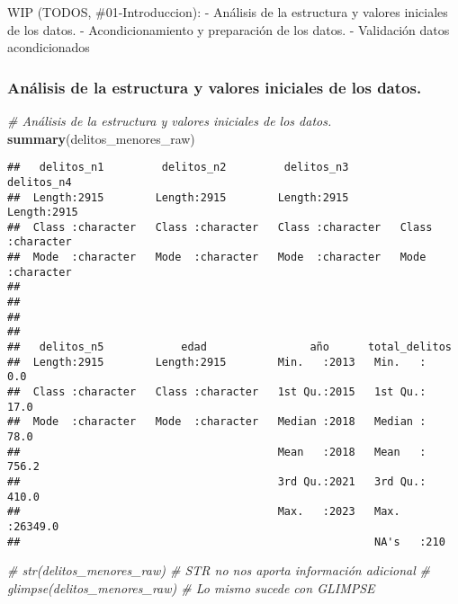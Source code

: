 \documentclass[,,,,pdftex]{Definitions/mdpi}
\newenvironment{Shaded}{\begin{snugshade}}{\end{snugshade}}
\newcommand{\CommentTok}[1]{\textcolor[rgb]{0.56,0.35,0.01}{\textit{#1}}}
\newcommand{\FunctionTok}[1]{\textcolor[rgb]{0.13,0.29,0.53}{\textbf{#1}}}
\newcommand{\NormalTok}[1]{#1}
\begin{document}
WIP (TODOS, \#01-Introduccion): - Análisis de la estructura y valores
iniciales de los datos. - Acondicionamiento y preparación de los datos.
- Validación datos acondicionados

\subsubsection{Análisis de la estructura y valores iniciales de los
datos.}\label{anuxe1lisis-de-la-estructura-y-valores-iniciales-de-los-datos.}

\begin{Shaded}
\begin{Highlighting}[]
\CommentTok{\# Análisis de la estructura y valores iniciales de los datos.}
\FunctionTok{summary}\NormalTok{(delitos\_menores\_raw)}
\end{Highlighting}
\end{Shaded}

\begin{verbatim}
##   delitos_n1         delitos_n2         delitos_n3         delitos_n4       
##  Length:2915        Length:2915        Length:2915        Length:2915       
##  Class :character   Class :character   Class :character   Class :character  
##  Mode  :character   Mode  :character   Mode  :character   Mode  :character  
##                                                                             
##                                                                             
##                                                                             
##                                                                             
##   delitos_n5            edad                año      total_delitos    
##  Length:2915        Length:2915        Min.   :2013   Min.   :    0.0  
##  Class :character   Class :character   1st Qu.:2015   1st Qu.:   17.0  
##  Mode  :character   Mode  :character   Median :2018   Median :   78.0  
##                                        Mean   :2018   Mean   :  756.2  
##                                        3rd Qu.:2021   3rd Qu.:  410.0  
##                                        Max.   :2023   Max.   :26349.0  
##                                                       NA's   :210
\end{verbatim}

\begin{Shaded}
\begin{Highlighting}[]
\CommentTok{\# str(delitos\_menores\_raw)     \# STR no nos aporta información adicional}
\CommentTok{\# glimpse(delitos\_menores\_raw) \# Lo mismo sucede con GLIMPSE}
\end{Highlighting}
\end{Shaded}
\end{document}
